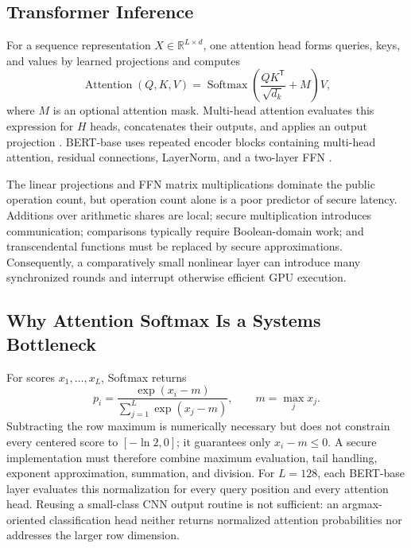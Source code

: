 \subsection{Transformer Inference}
For a sequence representation $X\in\mathbb{R}^{L\times d}$, one attention head forms queries, keys, and values by learned projections and computes
\begin{equation}
    \operatorname{Attention}(Q,K,V)
    =\operatorname{Softmax}\!\left(\frac{QK^{\mathsf T}}{\sqrt{d_k}}+M\right)V,
    \label{eq:attention}
\end{equation}
where $M$ is an optional attention mask. Multi-head attention evaluates this expression for $H$ heads, concatenates their outputs, and applies an output projection \cite{vaswani2017attention}. BERT-base uses repeated encoder blocks containing multi-head attention, residual connections, LayerNorm, and a two-layer FFN \cite{devlin2019bert}.

The linear projections and FFN matrix multiplications dominate the public operation count, but operation count alone is a poor predictor of secure latency. Additions over arithmetic shares are local; secure multiplication introduces communication; comparisons typically require Boolean-domain work; and transcendental functions must be replaced by secure approximations. Consequently, a comparatively small nonlinear layer can introduce many synchronized rounds and interrupt otherwise efficient GPU execution.

\subsection{Why Attention Softmax Is a Systems Bottleneck}
For scores $x_1,\ldots,x_L$, Softmax returns
\begin{equation}
    p_i=\frac{\exp(x_i-m)}{\sum_{j=1}^{L}\exp(x_j-m)},
    \qquad m=\max_j x_j.
    \label{eq:softmax}
\end{equation}
Subtracting the row maximum is numerically necessary but does not constrain every centered score to $[-\ln 2,0]$; it guarantees only $x_i-m\leq0$. A secure implementation must therefore combine maximum evaluation, tail handling, exponent approximation, summation, and division. For $L=128$, each BERT-base layer evaluates this normalization for every query position and every attention head. Reusing a small-class CNN output routine is not sufficient: an argmax-oriented classification head neither returns normalized attention probabilities nor addresses the larger row dimension.

